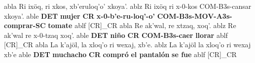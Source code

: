 \documentclass{article}%
\begin{document}
%
\ex
  	abla Ri ixöq, ri xkos, xb'eruloq'o' xkoya'.
  	ablz Ri ixöq ri x-0-kos COM-B3s-cansar xkoya'.
  	able \textbf{DET} \textbf{mujer} \textbf{CR} \textbf{x-0-b'e-ru-loq'-o'} \textbf{COM-B3s-MOV-A3s-comprar-SC} \textbf{tomate}
  	ablf [CR]_{CR}
\ex
  	abla Re ak'wal, re xtzaq, xoq'.
  	ablz Re ak'wal re x-0-tzaq xoq'.
  	able \textbf{DET} \textbf{niño} \textbf{CR} \textbf{COM-B3s-caer} \textbf{llorar}
  	ablf [CR]_{CR}
\ex
  	abla La k'ajöl, la xloq'o ri wexaj, xb'e.
  	ablz La k'ajöl la xloq'o ri wexaj xb'e
  	able \textbf{DET} \textbf{muchacho} \textbf{CR} \textbf{compró} \textbf{el pantalón} \textbf{se fue}
  	ablf [CR]_{CR}
\end{document}

